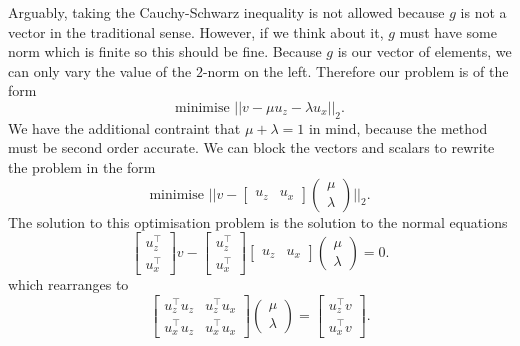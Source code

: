 Arguably, taking the Cauchy-Schwarz inequality is not allowed because $g$ is not a vector in the traditional sense.
However, if we think about it, $g$ must have some norm which is finite so this should be fine. %
Because $g$ is our vector of elements, we can only vary the value of the $2$-norm on the left.
Therefore our problem is of the form
\begin{equation*}
    \text{minimise } ||v - \mu u_z - \lambda u_x||_2.
\end{equation*}
We have the additional contraint that $\mu + \lambda = 1$ in mind, because the method must be second order accurate.
We can block the vectors and scalars to rewrite the problem in the form
\begin{equation*}
    \text{minimise } ||v - \begin{bmatrix}
        u_z & u_x
    \end{bmatrix} \begin{pmatrix}
        \mu \\
        \lambda
    \end{pmatrix}||_2.
\end{equation*}
The solution to this optimisation problem \cite{boyd2004convex} is the solution to the normal equations
\begin{equation*}
    \begin{bmatrix}
        u_z^\top \\
        u_x^\top
    \end{bmatrix} v - \begin{bmatrix}
        u_z^\top \\
        u_x^\top
    \end{bmatrix} \begin{bmatrix}
        u_z & u_x
    \end{bmatrix} \begin{pmatrix}
        \mu \\
        \lambda
    \end{pmatrix} = 0.
\end{equation*}
which rearranges to
\begin{equation*}
    \begin{bmatrix}
        u_z^\top u_z & u_z^\top u_x \\
        u_x^\top u_z & u_x^\top u_x
    \end{bmatrix} \begin{pmatrix}
        \mu \\
        \lambda
    \end{pmatrix} = \begin{bmatrix}
        u_z^\top v \\
        u_x^\top v
    \end{bmatrix}.
\end{equation*}
